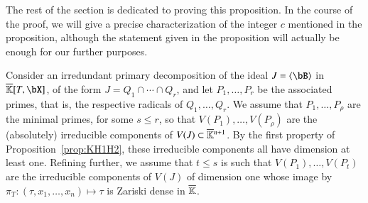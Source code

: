 \documentclass[amsthm]{elsart}
\begin{document}
The rest of the section is dedicated to proving this proposition.
In the course of the proof, we will give a precise characterization of
the integer $c$ mentioned in the proposition, although the statement
given in the proposition will actually be enough for our further
purposes.

Consider an irredundant primary decomposition of the ideal $J=\langle
\bB\rangle$ in $\KKbar[T,\bX]$, of the form $J=Q_1 \cap \cdots \cap
Q_r$, and let $P_1,\dots,P_r$ be the associated primes, that is, the
respective radicals of $Q_1,\dots,Q_r$. We assume that $P_1,\dots,P_\rho$
are the minimal primes, for some $s \le r$, so that
$V(P_1),\dots,V(P_\rho)$ are the (absolutely) irreducible components of
$V(J)\subset \overline{\mathbb{K}}{}^{n+1}$. By the first property of
Proposition~\ref{prop:KH1H2}, these irreducible components all have
dimension at least one. Refining further, we assume that $t \le s$ is
such that $V(P_1),\dots,V(P_t)$ are the irreducible components of
$V(J)$ of dimension one whose image by $\pi_T: (\tau,x_1,\dots,x_n)
\mapsto \tau$ is Zariski dense in $\overline{\mathbb{K}}$.
\end{document}
